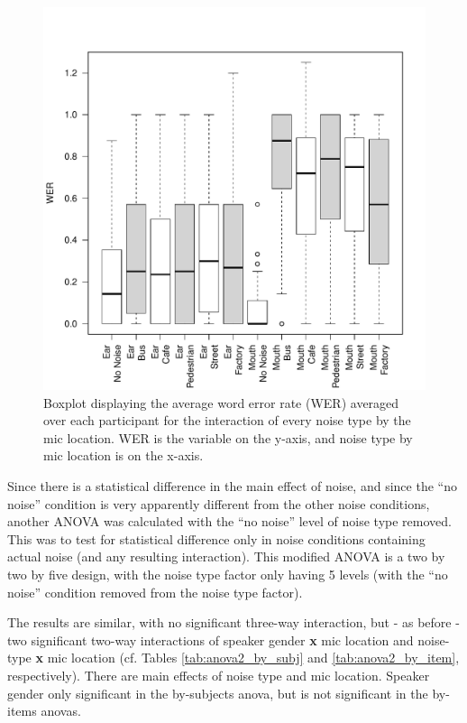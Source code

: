 \documentclass[dissertation,copyright]{uathesis}
\makeatletter
\def\maxwidth{ %
  \ifdim\Gin@nat@width>\linewidth
    \linewidth
  \else
    \Gin@nat@width
  \fi
}
\makeatother
\begin{document}
\begin{figure}[h!]%

\includegraphics[width=\maxwidth]{figure/boxplot_noiseXmic-1} 

\caption{Boxplot displaying the average word error rate (WER) averaged over each participant for the interaction of every noise type by the mic location. WER is the variable on the y-axis, and noise type by mic location is on the x-axis.}
\label{fig:anova1_noiseXmic_boxplot}
\end{figure}


Since there is a statistical difference in the main effect of noise, and since the ``no noise'' condition is very apparently different from the other noise conditions, another ANOVA was calculated with the ``no noise'' level of noise type removed.  This was to test for statistical difference only in noise conditions containing actual noise (and any resulting interaction). This modified ANOVA is a two by two by five design, with the noise type factor only having 5 levels (with the ``no noise'' condition removed from the noise type factor).

The results are similar, with no significant three-way interaction, but - as before - two significant two-way interactions of speaker gender \textbf{x} mic location and noise-type \textbf{x} mic location (cf. Tables \ref{tab:anova2_by_subj} and \ref{tab:anova2_by_item}, respectively).  There are main effects of noise type and mic location.  Speaker gender only significant in the by-subjects anova, but is not significant in the by-items anovas.
\end{document}
